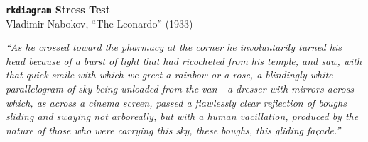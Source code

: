 \documentclass[12pt]{article}
\begin{document}
\begin{center}
  {\LARGE\bfseries \texttt{rkdiagram} Stress Test}\\[4pt]
  {\large Vladimir Nabokov, ``The Leonardo'' (1933)}
\end{center}

\bigskip

\noindent\textit{``As he crossed toward the pharmacy at the corner he
involuntarily turned his head because of a burst of light that had
ricocheted from his temple, and saw, with that quick smile with which we
greet a rainbow or a rose, a blindingly white parallelogram of sky being
unloaded from the van---a dresser with mirrors across which, as across a
cinema screen, passed a flawlessly clear reflection of boughs sliding and
swaying not arboreally, but with a human vacillation, produced by the
nature of those who were carrying this sky, these boughs, this gliding
fa\c{c}ade.''}

\bigskip
\end{document}
